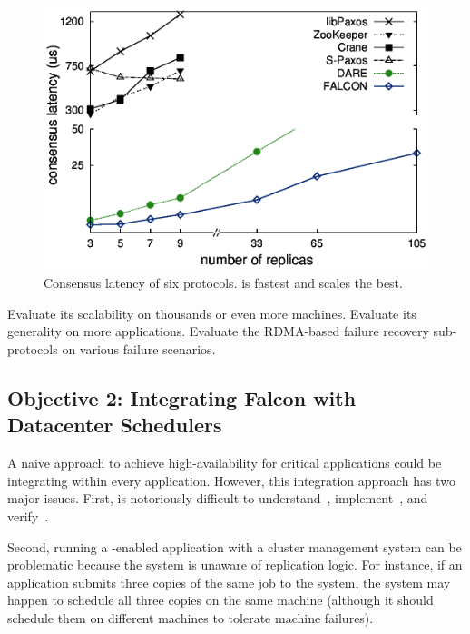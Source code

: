 \begin{figure}[!htb]
\centering
\includegraphics[width=0.34\textheight]{figures/traditional_paxos_latency.ps}
        \vspace{0.1in}
        \caption{Consensus latency of six \paxos protocols. \falcon is fastest 
and scales the best.}
        \label{fig:scalability}
\end{figure}

 Evaluate its scalability on thousands or even more 
machines. Evaluate its generality on more applications. Evaluate the RDMA-based 
failure recovery sub-protocols on various failure scenarios.

\vspace{-.15in}\subsection{Objective 2: 
Integrating Falcon with Datacenter Schedulers}\label{sec:detect}\vspace{-.075in}

A naive approach to achieve high-availability for critical applications could 
be integrating \paxos within every application. However, this integration 
approach has two major issues. First, \paxos is notoriously difficult 
to understand~\cite{raft:usenix14}, implement~\cite{paxos:practical}, and 
verify~\cite{demeter:sosp11}.

Second, running a \paxos-enabled application with a 
cluster management system can be problematic because the system is unaware 
of replication logic. For instance, if an application submits three copies of 
the same job to the system, the system may happen to schedule all three 
copies on the same machine (although it should schedule them on 
different machines to tolerate machine failures).

